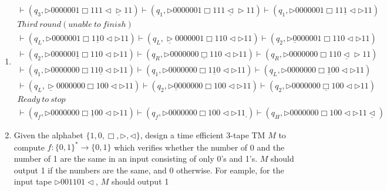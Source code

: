 \documentclass[12pt,a4paper]{article}
\makeatletter
\newtheorem*{solution}{Solution}
\theoremstyle{definition}
\renewenvironment{solution}[1][Solution] {\par\pushQED{\qed}\normalfont\topsep6\p@\@plus6\p@\relax\trivlist\item[\hskip\labelsep\bfseries#1\@addpunct{.}]\ignorespaces}{\popQED\endtrivlist\@endpefalse} \makeatother
\makeatother
\begin{document}
\begin{enumerate}
\begin{solution}
\begin{enumerate}
\begin{equation}
\begin{aligned}
	\vdash(q_3,\triangleright  0 0 0  0  0  0  1 \Box 1 1 1\triangleleft\underline{\triangleright } 1 1)
	\vdash(q_1,\triangleright  0 0 0  0  0  0  1 \Box 1 1 1\underline{\triangleleft}\triangleright 1 1)
	\vdash(q_1,\triangleright  0 0 0  0  0  0  1 \Box 1 1 \underline{1}\triangleleft\triangleright 1 1)\\
	Third~round(unable~to~finish)~~~~~~~~~~~~~~~~~~~~~~~~~~~~~~~~~~~~~~~\\
	\vdash(q_L,\triangleright  0 0 0  0  0  0  1 \Box 1 \underline{1} 0\triangleleft\triangleright 1 1)\vdash(q_L,\underline{\triangleright}  0 0 0  0  0  0  1 \Box 1 1 0\triangleleft\triangleright 1 1)\vdash(q_2,\triangleright  \underline{0} 0 0  0  0  0  1 \Box 1 1 0\triangleleft\triangleright 1 1)\\
	\vdash(q_2,\triangleright  0 0 0  0  0  0  \underline{1} \Box 1 1 0\triangleleft\triangleright 1 1)
	\vdash(q_R,\triangleright  0 0 0  0  0  0  0 \underline{\Box} 1 1 0\triangleleft\triangleright 1 1)
	\vdash(q_R,\triangleright  0 0 0  0  0  0  0 \Box 1 1 0\underline{\triangleleft}\triangleright 1 1)\\
	\vdash(q_1,\triangleright  0 0 0  0  0  0  0 \Box 1 1 \underline{0}\triangleleft\triangleright 1 1)
	\vdash(q_1,\triangleright  0 0 0  0  0  0  0 \Box 1 \underline{1} 0\triangleleft\triangleright 1 1)
	\vdash(q_L,\triangleright  0 0 0  0  0  0  0 \Box \underline{1} 0 0\triangleleft\triangleright 1 1)
	\\
	\vdash(q_L,\underline{\triangleright}  0 0 0  0  0  0  0 \Box 1 0 0\triangleleft\triangleright 1 1)
	\vdash(q_2,\triangleright  \underline{0} 0 0  0  0  0  0 \Box 1 0 0\triangleleft\triangleright 1 1)
	\vdash(q_2,\triangleright  0 0 0  0  0  0  0 \underline{\Box} 1 0 0\triangleleft\triangleright 1 1)\\
	Ready~to~stop~~~~~~~~~~~~~~~~~~~~~~~~~~~~~~~~~~~~~~~~~~~~~~~~~~~~~~~~~~~~~\\
	\vdash(q_f,\triangleright  0 0 0  0  0  0  0 \Box \underline{1} 0 0\triangleleft\triangleright 1 1)
	\vdash(q_f,\triangleright  0 0 0  0  0  0  0 \Box 1 0 0\triangleleft\triangleright 1 1\underline{~})
	\vdash(q_H,\triangleright  0 0 0  0  0  0  0 \Box 1 0 0\triangleleft\triangleright 1 1 \underline{\triangleleft})
            \end{aligned}
        \end{equation}
    \end{enumerate}
\end{solution}
    \item 
    Given the alphabet $\{1, 0, \Box, \triangleright, \triangleleft\}$, design a time efficient 3-tape TM $M$ to compute $f:\{0,1\}^*\rightarrow\{0,1\}$ which verifies whether the number of 0 and the number of 1 are the same in an input consisting of only 0's and 1's. $M$ should output 1 if the numbers are the same, and 0 otherwise. For eample, for the input tape $\triangleright 001101\triangleleft$, $M$ should output 1
    

\end{enumerate}
\end{document}
